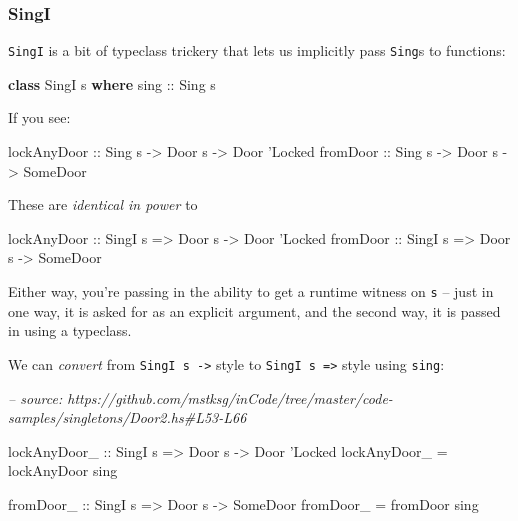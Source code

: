 \documentclass[]{article}
\newenvironment{Shaded}{}{}
\newcommand{\CommentTok}[1]{\textcolor[rgb]{0.38,0.63,0.69}{\textit{#1}}}
\newcommand{\DataTypeTok}[1]{\textcolor[rgb]{0.56,0.13,0.00}{#1}}
\newcommand{\KeywordTok}[1]{\textcolor[rgb]{0.00,0.44,0.13}{\textbf{#1}}}
\newcommand{\NormalTok}[1]{#1}
\newcommand{\OtherTok}[1]{\textcolor[rgb]{0.00,0.44,0.13}{#1}}
\begin{document}
\hypertarget{singi}{%
\subsubsection{SingI}\label{singi}}

\texttt{SingI} is a bit of typeclass trickery that lets us implicitly pass
\texttt{Sing}s to functions:

\begin{Shaded}
\begin{Highlighting}[]
\KeywordTok{class} \DataTypeTok{SingI}\NormalTok{ s }\KeywordTok{where}
\OtherTok{    sing ::} \DataTypeTok{Sing}\NormalTok{ s}
\end{Highlighting}
\end{Shaded}

If you see:

\begin{Shaded}
\begin{Highlighting}[]
\OtherTok{lockAnyDoor ::} \DataTypeTok{Sing}\NormalTok{  s }\OtherTok{->} \DataTypeTok{Door}\NormalTok{ s }\OtherTok{->} \DataTypeTok{Door} \DataTypeTok{'Locked}
\OtherTok{fromDoor    ::} \DataTypeTok{Sing}\NormalTok{  s }\OtherTok{->} \DataTypeTok{Door}\NormalTok{ s }\OtherTok{->} \DataTypeTok{SomeDoor}
\end{Highlighting}
\end{Shaded}

These are \emph{identical in power} to

\begin{Shaded}
\begin{Highlighting}[]
\OtherTok{lockAnyDoor ::} \DataTypeTok{SingI}\NormalTok{ s }\OtherTok{=>} \DataTypeTok{Door}\NormalTok{ s }\OtherTok{->} \DataTypeTok{Door} \DataTypeTok{'Locked}
\OtherTok{fromDoor    ::} \DataTypeTok{SingI}\NormalTok{ s }\OtherTok{=>} \DataTypeTok{Door}\NormalTok{ s }\OtherTok{->} \DataTypeTok{SomeDoor}
\end{Highlighting}
\end{Shaded}

Either way, you're passing in the ability to get a runtime witness on \texttt{s}
-- just in one way, it is asked for as an explicit argument, and the second way,
it is passed in using a typeclass.

We can \emph{convert} from \texttt{SingI\ s\ -\textgreater{}} style to
\texttt{SingI\ s\ =\textgreater{}} style using \texttt{sing}:

\begin{Shaded}
\begin{Highlighting}[]
\CommentTok{-- source: https://github.com/mstksg/inCode/tree/master/code-samples/singletons/Door2.hs#L53-L66}

\OtherTok{lockAnyDoor_ ::} \DataTypeTok{SingI}\NormalTok{ s }\OtherTok{=>} \DataTypeTok{Door}\NormalTok{ s }\OtherTok{->} \DataTypeTok{Door} \DataTypeTok{'Locked}
\NormalTok{lockAnyDoor_ }\OtherTok{=}\NormalTok{ lockAnyDoor sing}

\OtherTok{fromDoor_ ::} \DataTypeTok{SingI}\NormalTok{ s }\OtherTok{=>} \DataTypeTok{Door}\NormalTok{ s }\OtherTok{->} \DataTypeTok{SomeDoor}
\NormalTok{fromDoor_ }\OtherTok{=}\NormalTok{ fromDoor sing}
\end{Highlighting}
\end{Shaded}
\end{document}
